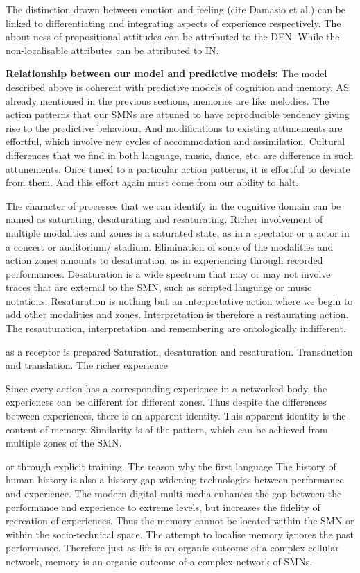 The distinction drawn between emotion and feeling (cite Damasio et al.) can be linked to differentiating and integrating aspects of experience respectively. The about-ness of propositional attitudes can be attributed to the DFN. While the non-localisable attributes can be attributed to IN.

\textbf{Relationship between our model and predictive models:} The model described above is coherent with predictive models of cognition and memory. AS already mentioned in the previous sections, memories are like melodies. The action patterns that our SMNs are attuned to have reproducible tendency giving rise to the predictive behaviour. And modifications to existing attunements are effortful, which involve new cycles of accommodation and assimilation. Cultural differences that we find in both language, music, dance, etc. are difference in such attunements. Once tuned to a particular action patterns, it is effortful to deviate from them. And this effort again must come from our ability to halt.

The character of processes that we can identify in the cognitive domain can be named as saturating, desaturating and resaturating. Richer involvement of multiple modalities and zones is a saturated state, as in a spectator or a actor in a concert or auditorium/ stadium. Elimination of some of the modalities and action zones amounts to desaturation, as in experiencing through recorded performances. Desaturation is a wide spectrum that may or may not involve traces that are external to the SMN, such as scripted language or music notations. Resaturation is nothing but an interpretative action where we begin to add other modalities and zones. Interpretation is therefore a restaurating action. The resauturation, interpretation and remembering are ontologically indifferent.

as a receptor is prepared 
Saturation, desaturation and resaturation.  
Transduction and translation.
The richer experience 

Since every action has a corresponding experience in a networked body, the experiences can be different for different zones. Thus despite the differences between experiences, there is an apparent identity. This apparent identity is the content of memory.
Similarity is of the pattern, which can be achieved from multiple zones of the SMN.


or through explicit training. The reason why the first language  The history of human history is also a history gap-widening technologies between performance and experience. The modern digital multi-media enhances the gap between the performance and experience to extreme levels, but increases the fidelity of recreation of experiences. Thus the memory cannot be located within the SMN or within the socio-technical space. The attempt to localise memory ignores the past performance. Therefore just as life is an organic outcome of a complex cellular network, memory is an organic outcome of a complex network of SMNs.

